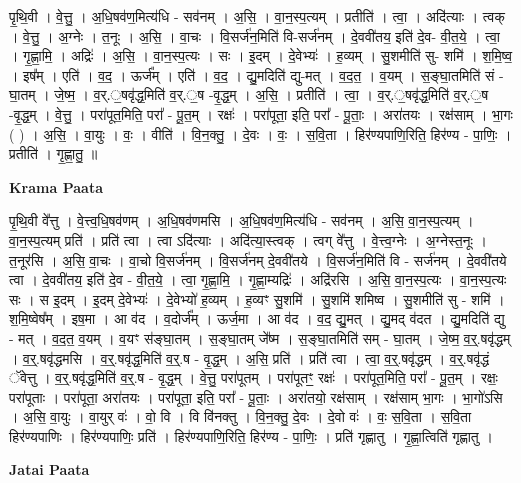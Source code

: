 \documentclass[17pt]{extarticle}
\begin{document}
पृ॒थि॒वी । वे॒त्तु॒ । अ॒धि॒षव॑ण॒मित्य॑धि - सव॑नम् । अ॒सि॒ । वा॒न॒स्प॒त्यम् । प्रतीति॑ । त्वा॒ । अदि॑त्याः । त्वक् । वे॒त्तु॒ । अ॒ग्नेः । त॒नूः । अ॒सि॒ । वा॒चः । वि॒सर्ज॑न॒मिति॑ वि-सर्ज॑नम् । दे॒ववी॑तय॒ इति॑ दे॒व- वी॒त॒ये॒ । त्वा॒ । गृ॒ह्णा॒मि॒ । अद्रिः॑ । अ॒सि॒ । वा॒न॒स्प॒त्यः । सः । इ॒दम् । दे॒वेभ्यः॑ । ह॒व्यम् । सु॒शमीति॑ सु- शमि॑ । श॒मि॒ष्व॒ । इष᳚म् । एति॑ । व॒द॒ । ऊर्ज᳚म् । एति॑ । व॒द॒ । द्यु॒मदिति॑ द्यु-मत् । व॒द॒त॒ । व॒यम् । स॒ङ्घा॒तमिति॑ सं - घा॒तम् । जे॒ष्म॒ । व॒र्.॒षवृ॑द्ध॒मिति॑ व॒र्.॒ष -वृ॒द्ध॒म् । अ॒सि॒ । प्रतीति॑ । त्वा॒ । व॒र्.॒षवृ॑द्ध॒मिति॑ व॒र्.॒ष -वृ॒द्ध॒म् । वे॒त्तु॒ । परा॑पूत॒मिति॒ परा᳚ - पू॒त॒म् । रक्षः॑ । परा॑पूता॒ इति॒ परा᳚ - पू॒ताः॒ । अरा॑तयः । रक्ष॑साम् । भा॒गः ( ) । अ॒सि॒ । वा॒युः । वः॒ । वीति॑ । वि॒न॒क्तु॒ । दे॒वः । वः॒ । स॒वि॒ता । हिर॑ण्यपाणि॒रिति॒ हिर॑ण्य - पा॒णिः॒ । प्रतीति॑ । गृ॒ह्णा॒तु॒ ॥  \newline


\textbf{Krama Paata} \newline

पृ॒थि॒वी वे᳚त्तु । वे॒त्त्व॒धि॒षव॑णम् । अ॒धि॒षव॑णमसि । अ॒धि॒षव॑ण॒मित्य॑धि - सव॑नम् । अ॒सि॒ वा॒न॒स्प॒त्यम् । वा॒न॒स्प॒त्यम् प्रति॑ । प्रति॑ त्वा । त्वा ऽदि॑त्याः । अदि॑त्या॒स्त्वक् । त्वग् वे᳚त्तु । वे॒त्त्व॒ग्नेः । अ॒ग्नेस्त॒नूः । त॒नूर॑सि । अ॒सि॒ वा॒चः । वा॒चो वि॒सर्ज॑नम् । वि॒सर्ज॑नम् दे॒ववी॑तये । वि॒सर्ज॑न॒मिति॑ वि - सर्ज॑नम् । दे॒ववी॑तये त्वा । दे॒ववी॑तय॒ इति॑ दे॒व - वी॒त॒ये॒ । त्वा॒ गृ॒ह्णा॒मि॒ । गृ॒ह्णा॒म्यद्रिः॑ । अद्रि॑रसि । अ॒सि॒ वा॒न॒स्प॒त्यः । वा॒न॒स्प॒त्यः सः । स इ॒दम् । इ॒दम् दे॒वेभ्यः॑ । दे॒वेभ्यो॑ ह॒व्यम् । ह॒व्यꣳ सु॒शमि॑ । सु॒शमि॑ शमिष्व । सु॒शमीति॑ सु - शमि॑ । श॒मि॒ष्वेष᳚म् । 
इष॒मा । आ व॑द । व॒दोर्ज᳚म् । ऊर्ज॒मा । आ व॑द । व॒द॒ द्यु॒मत् । द्यु॒मद् व॑दत । द्यु॒मदिति॑ द्यु - मत् । व॒द॒त॒ व॒यम् । व॒यꣳ स॑ङ्‍घा॒तम् । स॒ङ्‍घा॒तम् जे᳚ष्म । स॒ङ्‍घा॒तमिति॑ सम् - घा॒तम् । जे॒ष्म॒ व॒र्॒.षवृ॑द्धम् । व॒र्॒.षवृ॑द्धमसि । व॒र्॒.षवृ॑द्ध॒मिति॑ व॒र्॒.ष - वृ॒द्ध॒म् । अ॒सि॒ प्रति॑ । प्रति॑ त्वा । त्वा॒ व॒र्॒.षवृ॑द्धम् । व॒र्॒.षवृ॑द्धं ॅवेत्तु । व॒र्॒.षवृ॑द्ध॒मिति॑ व॒र्॒.ष - वृ॒द्ध॒म् । वे॒त्तु॒ परा॑पूतम् । परा॑पूतꣳ॒॒ रक्षः॑ । परा॑पूत॒मिति॒ परा᳚ - पू॒त॒म् । रक्षः॒ परा॑पूताः । परा॑पूता॒ अरा॑तयः । परा॑पूता॒ इति॒ परा᳚ - पू॒ताः॒ । अरा॑तयो॒ रक्ष॑साम् । रक्ष॑साम् भा॒गः । भा॒गो॑ऽसि । अ॒सि॒ वा॒युः । वा॒युर् वः॑ । वो॒ वि । वि वि॑नक्तु । वि॒न॒क्तु॒ दे॒वः । दे॒वो वः॑ । वः॒ स॒वि॒ता । स॒वि॒ता हिर॑ण्यपाणिः । हिर॑ण्यपाणिः॒ प्रति॑ । हिर॑ण्यपाणि॒रिति॒ हिर॑ण्य - पा॒णिः॒ । प्रति॑ गृह्णातु । गृ॒ह्णा॒त्विति॑ गृह्णातु । \newline

\textbf{Jatai Paata} \newline
\end{document}
